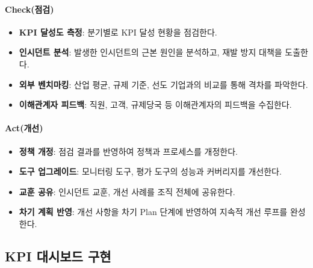 \paragraph{Check(점검)}
\begin{itemize}
 \item \textbf{KPI 달성도 측정}: 분기별로 KPI 달성 현황을 점검한다.
 \item \textbf{인시던트 분석}: 발생한 인시던트의 근본 원인을 분석하고, 재발 방지 대책을 도출한다.
 \item \textbf{외부 벤치마킹}: 산업 평균, 규제 기준, 선도 기업과의 비교를 통해 격차를 파악한다.
 \item \textbf{이해관계자 피드백}: 직원, 고객, 규제당국 등 이해관계자의 피드백을 수집한다.
\end{itemize}

\paragraph{Act(개선)}
\begin{itemize}
 \item \textbf{정책 개정}: 점검 결과를 반영하여 정책과 프로세스를 개정한다.
 \item \textbf{도구 업그레이드}: 모니터링 도구, 평가 도구의 성능과 커버리지를 개선한다.
 \item \textbf{교훈 공유}: 인시던트 교훈, 개선 사례를 조직 전체에 공유한다.
 \item \textbf{차기 계획 반영}: 개선 사항을 차기 Plan 단계에 반영하여 지속적 개선 루프를 완성한다.
\end{itemize}

\subsection{KPI 대시보드 구현}

